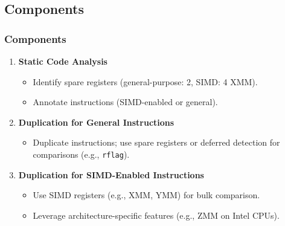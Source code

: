 \documentclass[
	12pt, %
]{beamer}
\begin{document}
\subsection{Components}
\begin{frame}
	\frametitle{Components}
	\begin{enumerate}
		\item \textbf{Static Code Analysis}
		\begin{itemize}
			\item Identify spare registers (general-purpose: 2, SIMD: 4 XMM).
			\item Annotate instructions (SIMD-enabled or general).	
		\end{itemize}
		
		\item \textbf{Duplication for General Instructions}
		\begin{itemize}
			\item Duplicate instructions; use spare registers or deferred detection for comparisons (e.g., \texttt{rflag}).
		\end{itemize}
		
		\item \textbf{Duplication for SIMD-Enabled Instructions}
		\begin{itemize}
			\item Use SIMD registers (e.g., XMM, YMM) for bulk comparison.
			
			\item Leverage architecture-specific features (e.g., ZMM on Intel CPUs).
		\end{itemize}
		
		
		
		
		
	\end{enumerate}
\end{frame}
\end{document}
